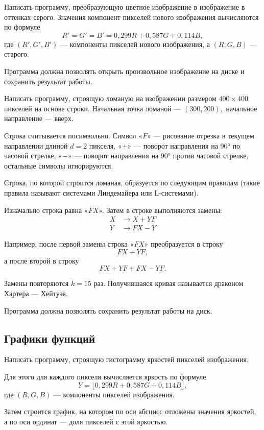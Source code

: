 \task Написать программу, преобразующую цветное изображение в
изображение в оттенках серого. Значения компонент пикселей нового изображения
вычисляются по формуле
\[
R' = G' = B' = 0{,}299 R + 0{,}587 G + 0{,}114 B,
\]
где $(R',G',B')$ — компоненты пикселей нового изображения, а $(R,G,B)$
— старого.

Программа должна позволять открыть произвольное изображение на диске и
сохранить результат работы.

\task Написать программу, строящую ломаную на изображении размером
$400 \times 400$ пикселей на основе строки. Начальная точка ломаной —
$(300, 200),$ начальное направление — вверх.

Строка считывается посимвольно. Символ «$F$» — рисование отрезка в
текущем направлении длиной $d=2$ пикселя, «$+$» — поворот направления на
90° по часовой стрелке, «$-$» — поворот направления на 90° против
часовой стрелке, остальные символы игнорируются.

Строка, по которой строится ломаная, образуется по следующим правилам
(такие правила называют системами Линдемайера или L-системами).

Изначально строка равна «$FX$». Затем в строке выполняются замены:
\[
\begin{aligned}
  X &\to X+YF\\
  Y &\to FX-Y
\end{aligned}
\]

Например, после первой замены строка «$FX$» преобразуется в строку
\[
FX+YF,
\]
а после второй в строку
\[
FX+YF+FX-YF.
\]

Замены повторяются $k = 15$ раз. Получившаяся кривая называется
драконом Хартера — Хейтуэя.

Программа должна позволять сохранить результат работы на диск.


\subsection{Графики функций}

\task Написать программу, строящую гистограмму яркостей пикселей
изображения.

Для этого для каждого пикселя вычисляется яркость по формуле
\[
Y = \lfloor 0{,}299 R + 0{,}587 G + 0{,}114 B \rfloor,
\]
где $(R,G,B)$ — компоненты пикселей изображения.

Затем строится график, на котором по оси абсцисс отложены значения
яркостей, а по оси ординат — доля пикселей с этой яркостью.

